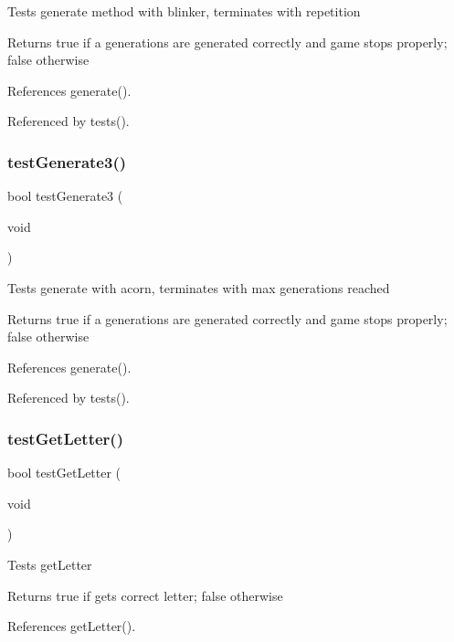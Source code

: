 Tests generate method with blinker, terminates with repetition \begin{DoxyReturn}{Returns}
true if a generations are generated correctly and game stops properly; false otherwise 
\end{DoxyReturn}


References generate().



Referenced by tests().

\mbox{\label{tests_8c_a165a4547fb67d114da1e6d6b630efe90}} 
\subsubsection{test\+Generate3()}
{\footnotesize\ttfamily bool test\+Generate3 (\begin{DoxyParamCaption}\item[{void}]{ }\end{DoxyParamCaption})}

Tests generate with acorn, terminates with max generations reached \begin{DoxyReturn}{Returns}
true if a generations are generated correctly and game stops properly; false otherwise 
\end{DoxyReturn}


References generate().



Referenced by tests().

\mbox{\label{tests_8c_a9b70c29f84da569aff4c79611734cae7}} 
\subsubsection{test\+Get\+Letter()}
{\footnotesize\ttfamily bool test\+Get\+Letter (\begin{DoxyParamCaption}\item[{void}]{ }\end{DoxyParamCaption})}

Tests get\+Letter \begin{DoxyReturn}{Returns}
true if gets correct letter; false otherwise 
\end{DoxyReturn}


References get\+Letter().



